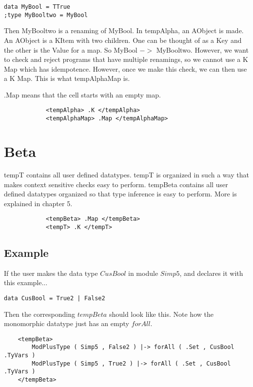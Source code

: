 \begin{lstlisting}
data MyBool = TTrue
;type MyBooltwo = MyBool
\end{lstlisting}

Then MyBooltwo is a renaming of MyBool. In tempAlpha, an AObject is made. An AObject is a KItem with two children. One can be thought of as a Key and the other is the Value for a map. So MyBool $->$ MyBooltwo. However, we want to check and reject programs that have multiple renamings, so we cannot use a K Map which has idempotence. However, once we make this check, we can then use a K Map. This is what tempAlphaMap is.

.Map means that the cell starts with an empty map.

\begin{lstlisting}
            <tempAlpha> .K </tempAlpha>
            <tempAlphaMap> .Map </tempAlphaMap>
\end{lstlisting}

\section{Beta}

tempT contains all user defined datatypes. tempT is organized in such a way that makes context sensitive checks easy to perform. tempBeta contains all user defined datatypes organized so that type inference is easy to perform. More is explained in chapter 5.
\begin{lstlisting}
            <tempBeta> .Map </tempBeta>
            <tempT> .K </tempT>
\end{lstlisting}

\subsection{Example}
If the user makes the data type $CusBool$ in module $Simp5$, and declares it with this example...
\begin{lstlisting}
data CusBool = True2 | False2
\end{lstlisting}

Then the corresponding $tempBeta$ should look like this. Note how the monomorphic datatype just has an empty $forAll$.

\begin{lstlisting}
    <tempBeta>
        ModPlusType ( Simp5 , False2 ) |-> forAll ( .Set , CusBool .TyVars )
        ModPlusType ( Simp5 , True2 ) |-> forAll ( .Set , CusBool .TyVars )
    </tempBeta>
\end{lstlisting}

